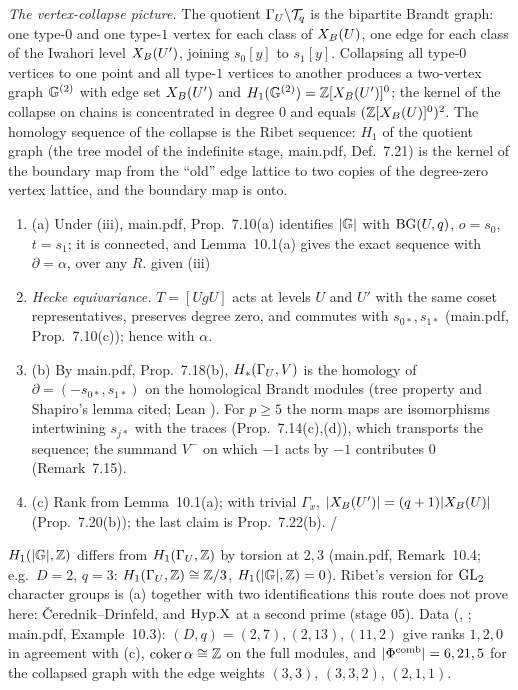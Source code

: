 \begin{outline}
\emph{The vertex-collapse picture.} The quotient $\Gamma_U\backslash\mathcal{T}_q$ is the bipartite Brandt graph: one type-$0$ and one type-$1$ vertex for each
class of $X_B(U)$, one edge for each class of the Iwahori level $X_B(U')$, joining $s_0[y]$ to $s_1[y]$. Collapsing all type-$0$ vertices to
one point and all type-$1$ vertices to another produces a two-vertex graph $\mathbb{G}^{(2)}$ with edge set $X_B(U')$ and $H_1(\mathbb{G}^{(2)})=\mathbb{Z}[X_B(U')]^0$; the
kernel of the collapse on chains is concentrated in degree $0$ and equals $(\mathbb{Z}[X_B(U)]^0)^2$. The homology sequence of the collapse is the Ribet
sequence: $H_1$ of the quotient graph (the tree model of the indefinite stage, main.pdf, Def.~7.21) is the kernel of the boundary map from the
``old'' edge lattice to two copies of the degree-zero vertex lattice, and the boundary map is onto.
\begin{enumerate}[label=(\arabic*)]
\item (a) Under (iii), main.pdf, Prop.~7.10(a) identifies $|\mathbb{G}|$ with $\mathrm{BG}(U,q)$, $o=s_0$, $t=s_1$; it is connected, and Lemma~10.1(a) gives the exact
  sequence with $\partial=\alpha$, over any $R$. \stproved{} given (iii)
\item \emph{Hecke equivariance.} $T=[UgU]$ acts at levels $U$ and $U'$ with the same coset representatives, preserves degree zero, and commutes with
  $s_{0*},s_{1*}$ (main.pdf, Prop.~7.10(c)); hence with $\alpha$. \stproved
\item (b) By main.pdf, Prop.~7.18(b), $H_*(\Gamma_U,V)$ is the homology of $\partial=(-s_{0*},s_{1*})$ on the homological Brandt modules
  \stpmc{} (tree property and Shapiro's lemma cited; Lean ). For $p\ge5$ the norm maps are isomorphisms intertwining
  $s_{j*}$ with the traces (Prop.~7.14(c),(d)), which transports the sequence; the summand $V^-$ on which $-1$ acts by $-1$ contributes $0$ (Remark~7.15).
\item (c) Rank from Lemma~10.1(a); with trivial $\Gamma_x$, $|X_B(U')|=(q+1)|X_B(U)|$ (Prop.~7.20(b)); the last claim is Prop.~7.22(b). \stproved{} / \stpmc
\end{enumerate}
$H_1(|\mathbb{G}|,\mathbb{Z})$ differs from $H_1(\Gamma_U,\mathbb{Z})$ by torsion at $2,3$ (main.pdf, Remark~10.4; e.g.\ $D=2$, $q=3$: $H_1(\Gamma_U,\mathbb{Z})\cong\mathbb{Z}/3$, $H_1(|\mathbb{G}|,\mathbb{Z})=0$).
Ribet's version for $\mathrm{GL}_2$ character groups is (a) together with two identifications this route does not prove here: \v{C}erednik--Drinfeld, and
$\mathrm{Hyp.X}$ at a second prime (stage 05). Data (\stcomp, ; main.pdf, Example~10.3): $(D,q)=(2,7),(2,13),(11,2)$ give ranks $1,2,0$ in agreement with (c),
$\operatorname{coker}\alpha\cong\mathbb{Z}$ on the full modules, and $|\Phi^{\mathrm{comb}}|=6,21,5$ for the collapsed graph with the edge weights $(3,3)$, $(3,3,2)$, $(2,1,1)$.
\end{outline}

